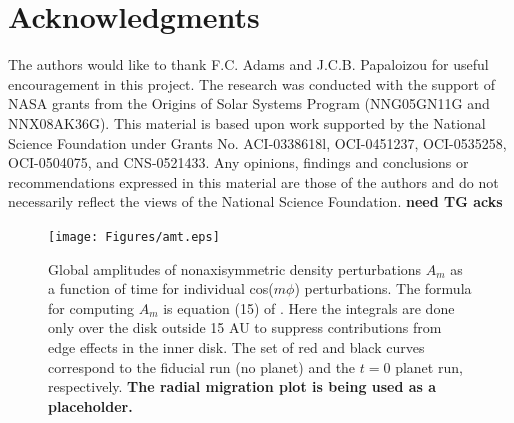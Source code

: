 \documentclass[12pt,manuscript,authoryear]{aastex}
\begin{document}
\section{Acknowledgments}

The authors would like to thank F.C. Adams and J.C.B. Papaloizou for useful encouragement in this project. The research was conducted with the support of NASA grants from the Origins of Solar Systems  Program (NNG05GN11G and NNX08AK36G). This material is based upon work supported by the National Science Foundation under Grants No. ACI-0338618l, OCI-0451237, OCI-0535258, OCI-0504075, and CNS-0521433. Any opinions, findings and conclusions or recommendations expressed in this material are those of the authors and do not necessarily reflect the views of the National Science Foundation. {\bf need TG acks}




\newpage

\begin{figure}[t]
\center
\texttt{[image: Figures/amt.eps]}
\caption{Global amplitudes of nonaxisymmetric density perturbations $A_m$ as a function of time for individual cos($m\phi$) perturbations. The formula for computing $A_m$ is equation (15) of \citep{boley2006}. Here the integrals are done only over the disk outside 15 AU to suppress contributions from edge effects in the inner disk. The set of red and black curves correspond to the fiducial run (no planet) and the $t = 0$ planet run, respectively. {\bf The radial migration plot is being used as a placeholder.}}
\label{fig:Am}
\end{figure}
\end{document}
